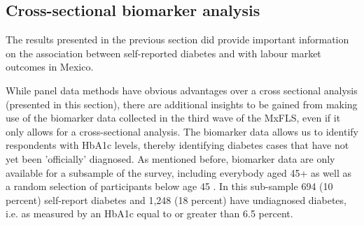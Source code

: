 \subsection{Cross-sectional biomarker analysis}

The results presented in the previous section did provide important
information on the association between self-reported diabetes and
with labour market outcomes in Mexico.

While panel data methods have obvious advantages over a cross sectional
analysis (presented in this section), there are additional insights
to be gained from making use of the biomarker data collected in the
third wave of the \ac{MxFLS}, even if it only allows for a cross-sectional
analysis. The biomarker data allows us to identify respondents with
\ac{HbA1c} levels, thereby identifying diabetes cases that have
not yet been 'officially' diagnosed. As mentioned before, biomarker
data are only available for a subsample of the survey, including everybody
aged 45+ as well as a random selection of participants below age 45
\citep{Crimmins2015}. In this sub-sample 694 (10 percent) self-report
diabetes and 1,248 (18 percent) have undiagnosed diabetes, i.e. as
measured by an \ac{HbA1c} equal to or greater than 6.5 percent.

  
  